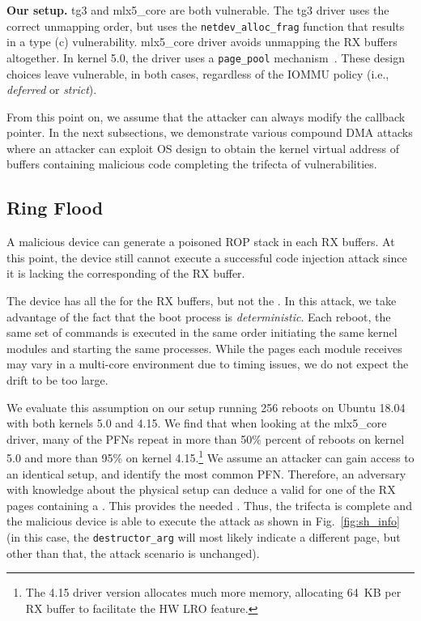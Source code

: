 \smallskip
\noindent\textbf{Our setup.} tg3 and mlx5\_core are both vulnerable. The tg3 driver uses the correct unmapping order, but uses the \texttt{netdev\_alloc\_frag} function that results in a type (c) \subpage{} vulnerability. mlx5\_core driver avoids unmapping the RX buffers altogether. In kernel 5.0, the driver uses a \texttt{page\_pool} mechanism~\cite{page_pool}. These design choices leave \shinfo{} vulnerable, in both cases, regardless of the IOMMU policy (i.e., \emph{deferred} or \emph{strict}).


From this point on, we assume that the attacker can always modify the callback pointer. In the next subsections, we demonstrate various compound DMA attacks where an attacker can exploit OS design to obtain the kernel virtual address of buffers containing malicious code completing the trifecta of vulnerabilities.

\subsection{Ring Flood}\label{sec:ringflod}
A malicious device can generate a poisoned ROP stack in each RX buffers. At this point, the device still cannot execute a successful code injection attack since it is lacking the corresponding \kva of the RX buffer.

The device has all the \iova{} for the RX buffers, but not the \kva{}. In this attack, we take advantage of the fact that the boot process is \emph{deterministic}. Each reboot, the same set of commands is executed in the same order initiating the same kernel modules and starting the same processes. While the pages each module receives may vary in a multi-core environment due to timing issues, we do not expect the drift to be too large. 

We evaluate this assumption on our setup running 256 reboots on Ubuntu 18.04 with both kernels 5.0 and 4.15.
We find that when looking at the mlx5\_core driver, many of the PFNs repeat in more than 50\% percent of reboots on kernel 5.0 and more than 95\% on kernel 4.15.\footnote{The 4.15 driver version allocates much more memory, allocating 64~KB per RX buffer to facilitate the HW LRO feature.} We assume an attacker can gain access to an identical setup, and identify the most common PFN. Therefore, an adversary with knowledge about the physical setup can deduce a valid \kva{} for one of the RX pages containing a \mabaf. This provides the needed \kva. Thus, the trifecta is complete and the malicious device is able to execute the attack as shown in Fig.~\ref{fig:sh_info} (in this case, the \texttt{destructor\_arg} will most likely indicate a different page, but other than that, the attack scenario is unchanged).


